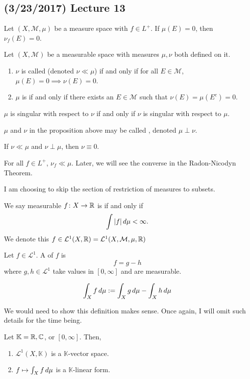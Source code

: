 \documentclass[11pt,leqno,oneside]{amsbook}
\numberwithin{thm}{section}
\newcommand{\M}{\mathcal{M}} %
\newcommand{\cL}{\mathcal{L}}
\begin{document}
\subsection*{(3/23/2017) Lecture 13}
\begin{prop}
  Let \((X,\M,\mu)\) be a measure space with \(f \in L^+\). If
  \(\mu(E) = 0\), then \(\nu_f(E) = 0\).
\end{prop}
\begin{defn}
  Let \((X,\M)\) be a measurable space with measures \(\mu,\nu\) both
  defined on it.
  \begin{enumerate}
  \item \(\nu\) is called  (denoted \(\nu \ll \mu\)) if and only if for all \(E
    \in \M\), \(\mu(E) = 0 \implies \nu(E) = 0\).
  \item \(\mu\) is  if and only
    if there exists an \(E \in \M\) such that \(\nu(E) = \mu(E^c) =
    0\).
  \end{enumerate}
\end{defn}
\begin{prop}
  \(\mu\) is singular with respect to \(\nu\) if and only if \(\nu\)
  is singular with respect to \(\mu\).
\end{prop}
\begin{defn}
  \(\mu\) and \(\nu\) in the proposition above may be called
  , denoted \(\mu \perp \nu\).
\end{defn}
\begin{rmk}
  If \(\nu \ll \mu\) and \(\nu \perp \mu\), then \(\nu \equiv 0\).
\end{rmk}
\begin{rmk}
  For all \(f \in L^+\), \(\nu_f \ll \mu\). Later, we will see the
  converse in the Radon-Nicodyn Theorem.
\end{rmk}
I am choosing to skip the section of restriction of measures to
subsets.
\begin{defn}
  We say measurable \(f \colon X \to {\mathbb R}\) is  if and only if \[
    \int |f| \, d\mu < \infty.
  \]
  We denote this \(f \in \cL^1(X,\R) = \cL^1(X,\M,\mu,\R)\)
\end{defn}
\begin{defn}
  Let \(f \in \cL^1\). A  of \(f\) is \[
    f = g-h
  \]
  where \(g,h \in \cL^1\) take values in \([0,\infty]\) and are
  measurable.
\end{defn}
\begin{defn}
  \[
    \int_X f \, d\mu := \int_X g \, d\mu - \int_X h \, d\mu
  \]
\end{defn}
We would need to show this definition makes sense. Once again, I will
omit such details for the time being.
\begin{prop}
  Let \(\mathbb{K} = {\mathbb R},{\mathbb C}\), or \([0,\infty]\). Then,
  \begin{enumerate}
  \item \(\cL^1(X,\mathbb{K})\) is a \(\mathbb{K}\)-vector space.
  \item \(f \mapsto \int_X f \, d\mu\) is a \(\mathbb{K}\)-linear form.
  \end{enumerate}
\end{prop}
\end{document}
